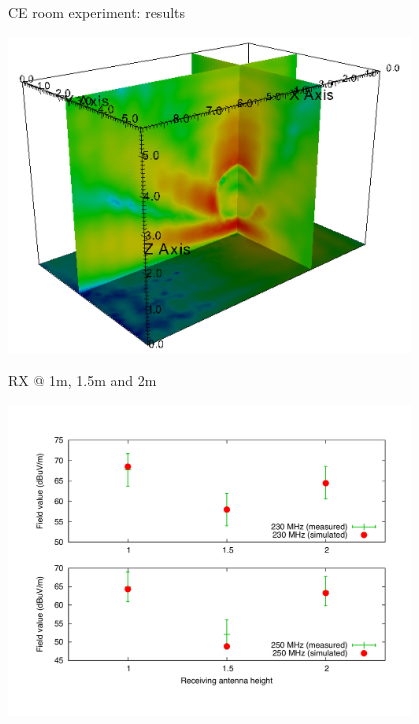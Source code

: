 \documentclass{beamer}
\begin{document}
\begin{frame}{CE room experiment: results}
\begin{minipage}{0.48\textwidth}
        \includegraphics[width=0.8\textwidth]{img/ant230}

        RX @ 1m, 1.5m and 2m

        \includegraphics[width=0.8\textwidth]{img/hole}
    \end{minipage}
\end{frame}
\end{document}
